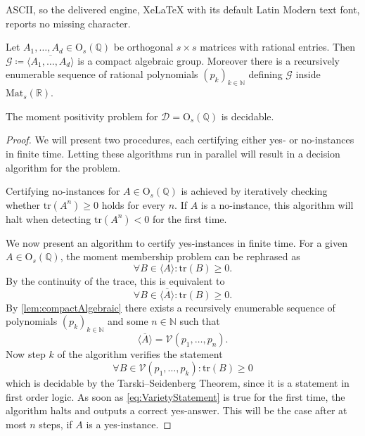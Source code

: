 \documentclass[10pt,a4paper]{amsart}
\newcommand{\tr}{\mathrm{tr}}
\begin{document}
ASCII, so the delivered engine, XeLaTeX with its default Latin Modern text font, reports no missing character.
\begin{lemma}\label{lem:compactAlgebraic}
Let $A_1, \ldots, A_d \in \mathrm{O}_s(\mathbb{Q})$ be orthogonal $s \times s$ matrices with rational entries. Then $\mathcal{G} \coloneqq \overline{\langle A_1, \ldots, A_d \rangle}$ is a compact algebraic group.
Moreover there is a recursively enumerable sequence of rational polynomials $(p_k)_{k \in \mathbb{N}}$ defining $\mathcal{G}$ inside $\mathrm{Mat}_s(\mathbb R)$.

\end{lemma}

\begin{theorem}
\label{thm:moment_orthogonal}
The moment positivity problem for  $\mathcal D=\mathrm{O}_s(\mathbb{Q})$  is decidable.
\end{theorem}

\begin{proof}
We will present two procedures, each certifying either yes- or no-instances in finite time. Letting these algorithms run in parallel will result in a decision algorithm for the problem.

Certifying no-instances for $A \in \mathrm{O}_s(\mathbb{Q})$ is achieved by iteratively checking whether $\tr(A^n) \geqslant 0$ holds for every  $n$. If $A$ is a no-instance, this algorithm will halt when detecting $\tr(A^n) < 0$ for the first time.

We now present an algorithm to certify yes-instances in finite time. For a given $A \in \mathrm{O}_s(\mathbb{Q})$, the moment membership problem can be rephrased  as
$$\forall B \in \langle A \rangle: \tr(B) \geqslant 0.$$
By the continuity of the trace, this is equivalent to 
\begin{equation}
\label{eq:firstOrderStatement}
\forall B \in \overline{\langle A \rangle}: \tr(B) \geqslant 0.
\end{equation}
By \cref{lem:compactAlgebraic} there exists a recursively enumerable sequence of polynomials $(p_k)_{k \in \mathbb{N}}$ and some $n \in \mathbb{N}$ such that
$$\overline{\langle A\rangle} = \mathcal{V}(p_1,\ldots, p_n).$$
Now step $k$ of the algorithm verifies the statement
\begin{equation}\label{eq:VarietyStatement}
\forall B \in \mathcal{V}(p_1, \ldots, p_k)\colon \tr(B) \geqslant 0
\end{equation}
which is decidable by the Tarski--Seidenberg Theorem, since it is a statement in first order logic. As soon  as  \cref{eq:VarietyStatement} is true for the first time, the algorithm halts and outputs a correct yes-answer. This  will be the case after at most $n$ steps, if $A$ is a yes-instance.
\end{proof}
\end{document}
